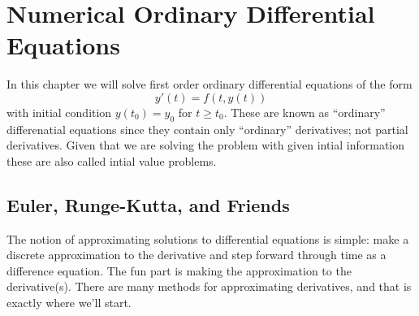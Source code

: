 \chapter{Numerical Ordinary Differential Equations}\label{ch:odes}

In this chapter we will solve first order ordinary differential equations of the form
\[ y'(t) = f(t,y(t)) \]
with initial condition $y(t_0)=y_0$ for $t\ge t_0$.  These are known as ``ordinary''
differenatial equations since they contain only ``ordinary'' derivatives; not partial
derivatives.  Given that we are solving the problem with given intial information these
are also called intial value problems.  

\section{Euler, Runge-Kutta, and Friends}
The notion of approximating solutions to differential equations is simple: make a discrete
approximation to the derivative and step forward through time as a difference equation.
The fun part is making the approximation to the derivative(s).  There are many methods for
approximating derivatives, and that is exactly where we'll start.

